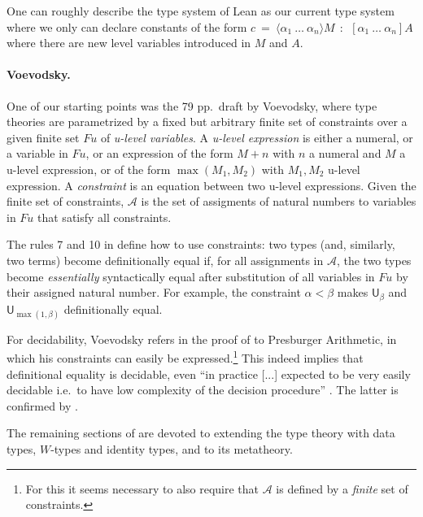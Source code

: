 \documentclass[11pt,a4paper]{article}
\theoremstyle{definition}
\newcommand{\UU}{\mathsf{U}}
\newcommand{\lam}[1]{{\langle}#1{\rangle}}
\newcommand{\AFu}{\mathcal{A}}
\newcommand{\Fu}{\mathit{Fu}}
\begin{document}
One can roughly describe the type system of Lean \cite{moura:lean,Carneiro19} as our current type system
where we only can declare constants of the form
$c~=~\lam{\alpha_1~\dots~\alpha_n}M~~:~~[\alpha_1~\dots~\alpha_n]A$ where there are new level variables introduced in $M$ and
$A$.

\paragraph{Voevodsky.} One of our starting points was the 79 pp.\ draft \cite{VV} by Voevodsky, where type theories are parametrized by a fixed but arbitrary finite set of constraints over a given finite
set $\Fu$ of \emph{u-level variables}. A \emph{u-level expression} \cite[Def. 2.0.2]{VV} is either a numeral,
or a variable in $\Fu$, or an expression of the form $M+n$ with $n$
a numeral and $M$ a u-level expression, or of the form $\max(M_1,M_2)$
with $M_1,M_2$ u-level expression. A \emph{constraint} is an equation
between two u-level expressions. Given the finite set of constraints,
$\AFu$ is the set of assigments of natural numbers to variables
in $\Fu$ that satisfy all constraints.

The rules 7 and 10 in \cite[Section 3.4]{VV} define how to use constraints:
two types (and, similarly, two terms) become definitionally equal
if, for all assignments in $\AFu$, the two types become \emph{essentially}
syntactically equal after substitution of all variables in $\Fu$ by
their assigned natural number. For example, the constraint
$\alpha < \beta$ makes $\UU_\beta$ and $\UU_{\max(1,\beta)}$
definitionally equal.

For decidability, Voevodsky refers in the proof of
\cite[Lemma 2.0.4, proof]{VV} to Presburger Arithmetic,
in which his constraints can easily be expressed.\footnote{%
For this it seems necessary to also require that $\AFu$
is defined by a \emph{finite} set of constraints.}%
This indeed implies that definitional equality is decidable, even
``in practice [...] expected to be very easily decidable i.e.\
to have low complexity of the decision procedure''
\cite[p.\ 5, l.\ -13]{VV}.
The latter is confirmed by \cite{bezem-coquand:lattices}.

The remaining sections of \cite{VV} are devoted to extending the
type theory with data types, $W$-types and identity types,
and to its metatheory.
\end{document}
